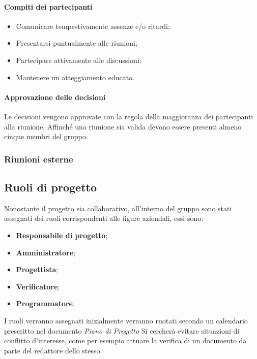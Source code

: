                      \paragraph{Compiti dei partecipanti}
                        \begin{itemize}
                            \item Comunicare tempestivamente assenze e/o ritardi; 
                            \item Presentarsi puntualmente alle riunioni;
                            \item Partecipare attivamente alle discussioni;
                            \item Mantenere un atteggiamento educato.
                        \end{itemize}
                    \paragraph{Approvazione delle decisioni}
                        Le decisioni vengono approvate con la regola della maggioranza dei partecipanti alla riunione.
                        Affinché una riunione sia valida devono essere presenti almeno cinque membri del gruppo.
                        
                  \subsubsection{Riunioni esterne}
                  
            \subsection{Ruoli di progetto}
                Nonostante il progetto sia collaborativo, all'interno del gruppo sono stati assegnati dei ruoli corrispondenti alle figure aziendali, essi sono:
                \begin{itemize}
                    \item \textbf{Responsabile di progetto};
                    \item \textbf{Amministratore};
                    \item \textbf{Progettista};
                    \item \textbf{Verificatore};
                    \item \textbf{Programmatore}.
                \end{itemize}
                I ruoli verranno assegnati inizialmente verranno ruotati secondo un calendario prescritto nel documento \textit{Piano di Progetto}
                Si cercherà evitare situazioni di conflitto d'interesse, come per esempio attuare la verifica di un documento da parte del redattore dello stesso.
